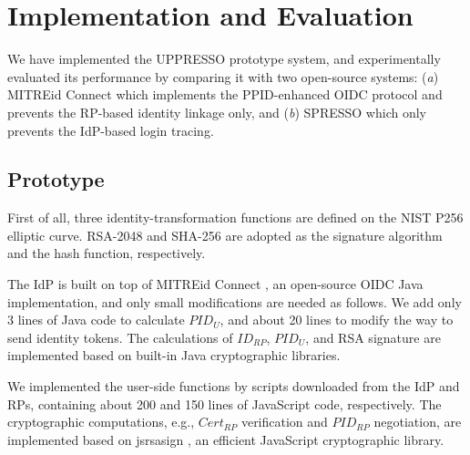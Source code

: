 \section{Implementation and Evaluation}
\label{sec:implementation}
We have implemented the UPPRESSO prototype system, and experimentally evaluated its performance
 by comparing it with two open-source systems:
  (\emph{a}) MITREid Connect \cite{MITREid}
    which implements the PPID-enhanced OIDC protocol and prevents the RP-based identity linkage only,
     and (\emph{b}) SPRESSO \cite{SPRESSO} which only prevents the IdP-based login tracing.

\subsection{Prototype}
First of all, three identity-transformation functions are defined on
        the NIST P256 elliptic curve.
RSA-2048 and SHA-256 are adopted as the signature algorithm and the hash function, respectively.

The IdP is built on top of MITREid Connect \cite{MITREid},
    an open-source OIDC Java implementation, %
    and only small modifications are needed as follows.
We add only 3 lines of Java code to calculate $PID_U$,
    and about 20 lines to modify the way to send identity tokens.
The calculations of $ID_{RP}$, $PID_U$, and RSA signature are implemented based on built-in Java cryptographic libraries. %

We implemented the user-side functions by scripts downloaded from the IdP and RPs,
     containing about 200 and 150 lines of JavaScript code, respectively.
The cryptographic computations, e.g., $Cert_{RP}$ verification and $PID_{RP}$ negotiation, are implemented based on jsrsasign \cite{jsrsasign}, an efficient JavaScript cryptographic library.


